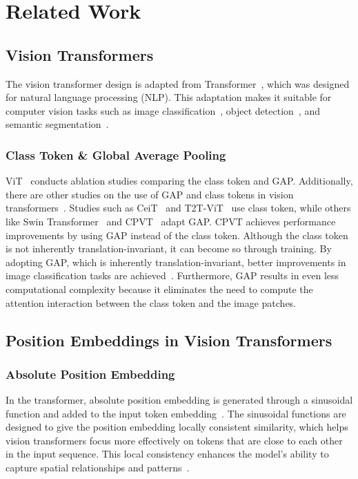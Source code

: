 \section{Related Work}
\subsection{Vision Transformers}
The vision transformer design is adapted from Transformer~\cite{trnasformer}, which was designed for natural language processing (NLP). This adaptation makes it suitable for computer vision tasks such as image classification~\cite{vit, DeiT, swin}, object detection~\cite{detr, detr2}, and semantic segmentation~\cite{setr, setr2, segmenter}. 

\subsubsection{Class Token \& Global Average Pooling}
ViT~\cite{vit} conducts ablation studies comparing the class token and GAP. Additionally, there are other studies on the use of GAP and class tokens in vision transformers~\cite{gap_cls, cpvt}. Studies such as CeiT~\cite{ceit} and T2T-ViT~\cite{t2t} use class token, while others like Swin Transformer~\cite{swin} and CPVT~\cite{cpvt} adapt GAP. CPVT achieves performance improvements by using GAP instead of the class token. Although the class token is not inherently translation-invariant, it can become so through training. By adopting GAP, which is inherently translation-invariant, better improvements in image classification tasks are achieved~\cite{cpvt}. Furthermore, GAP results in even less computational complexity because it eliminates the need to compute the attention interaction between the class token and the image patches. 

\subsection{Position Embeddings in Vision Transformers}

\subsubsection{Absolute Position Embedding} In the transformer, absolute position embedding is generated through a sinusoidal function and added to the input token embedding~\cite{trnasformer}. The sinusoidal functions are designed to give the position embedding locally consistent similarity, which helps vision transformers focus more effectively on tokens that are close to each other in the input sequence. This local consistency enhances the model's ability to capture spatial relationships and patterns~\cite{trnasformer}.

